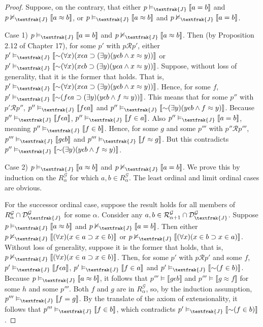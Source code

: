 \documentclass{article}
\newcommand*{\oldneg}{\mathord{\sim}}
\newcommand{\lbc}{\llbracket}
\newcommand{\rbc}{\rrbracket}
\theoremstyle{definition}
\begin{document}
\begin{proof}
Suppose, on the contrary, that either $p\vDash_\textfrak{J}\lbc a=b\rbc$ and 
$p\nvDash_\textfrak{J}\lbc a\approx b\rbc$, or
$p\vDash_\textfrak{J}\lbc a\approx b\rbc$ and $p\nvDash_\textfrak{J}\lbc a=b\rbc$.

Case 1) $p\vDash_\textfrak{J}\lbc a=b\rbc$ and 
$p\nvDash_\textfrak{J}\lbc a\approx b\rbc$. Then (by Proposition 2.12 of Chapter 17), for some $p'$ with $p\mathcal{R}p'$,
either $p'\vDash_\textfrak{J}\lbc\oldneg(\forall x)(x\epsilon a\supset(\exists y)(y\epsilon b\wedge x\approx y))\rbc$ or
$p'\vDash_\textfrak{J}\lbc\oldneg(\forall x)(x\epsilon b\supset(\exists y)(y\epsilon a\wedge x\approx y))\rbc$. Suppose, without loss of generality, that it is the 
former that holds. That is, $p'\vDash_\textfrak{J}\lbc\oldneg(\forall x)(x\epsilon a\supset(\exists y)(y\epsilon b\wedge x\approx y))\rbc$. Hence, 
for some $f$, $p'\vDash_\textfrak{J}\lbc\oldneg(f\epsilon a\supset(\exists y)(y\epsilon b\wedge f\approx y))\rbc$. This means that for some 
$p''$ with $p'\mathcal{R}p''$,
$p''\vDash_\textfrak{J}\lbc f\epsilon a\rbc$ and $p''\vDash_\textfrak{J}\lbc\oldneg(\exists y)(y\epsilon b\wedge f\approx y)\rbc$. Because 
$p''\vDash_\textfrak{J}\lbc f\epsilon a\rbc$, $p''\vDash_\textfrak{J}\lbc f\in a\rbc$. Also
$p''\vDash_\textfrak{J}\lbc a=b\rbc$, meaning $p''\vDash_\textfrak{J}\lbc f\in b\rbc$. Hence, for some 
$g$ and some $p'''$ with $p''\mathcal{R}p'''$, $p'''\vDash_\textfrak{J}\lbc g\epsilon b\rbc$ and 
$p'''\vDash_\textfrak{J}\lbc f\approx g\rbc$. But this contradicts $p''\vDash_\textfrak{J}\lbc\oldneg(\exists y)(y\epsilon b\wedge f\approx y)\rbc$.

Case 2) $p\vDash_\textfrak{J}\lbc a\approx b\rbc$ and $p\nvDash_\textfrak{J}\lbc a=b\rbc$. We prove this by induction on the 
$R^\mathcal{G}_\alpha$ for which $a,b\in R^\mathcal{G}_\alpha$. The least ordinal and limit ordinal cases are obvious.

For the successor ordinal case, suppose the result holds for all members of 
$R^\mathcal{G}_\alpha\cap\mathcal{D}^\mathcal{G}_\textfrak{J}$ for some $\alpha$. Consider any 
$a,b\in\mathcal{R}^\mathcal{G}_{\alpha+1}\cap\mathcal{D}^\mathcal{G}_\textfrak{J}$. Suppose 
$p\vDash_\textfrak{J}\lbc a\approx b\rbc$ and $p\nvDash_\textfrak{J}\lbc a=b\rbc$. Then either
$p\nvDash_\textfrak{J}\lbc(\forall x)(x\in a\supset x\in b)\rbc$ or $p\nvDash_\textfrak{J}\lbc(\forall x)(x\in b\supset x\in a)\rbc$. Without loss of 
generality, suppose it is the former that holds, that is, $p\nvDash_\textfrak{J}\lbc(\forall x)(x\in a\supset x\in b)\rbc$. Then, for some 
$p'$ with $p\mathcal{R}p'$ and some $f$, $p'\vDash_\textfrak{J}\lbc f\epsilon a\rbc$,
$p'\vDash_\textfrak{J}\lbc f\in a\rbc$ and $p'\vDash_\textfrak{J}\lbc\oldneg(f\in b)\rbc$.
Because $p\vDash_\textfrak{J}\lbc a\approx b\rbc$, it follows that 
$p'''\vDash\lbc g\epsilon b\rbc$ and $p'''\vDash\lbc g\approx f\rbc$ for some $h$ and some $p'''$. 
Both $f$ and $g$ are in $R^\mathcal{G}_\alpha$, so, by the induction assumption,
$p'''\vDash_\textfrak{J}\lbc f=g\rbc$. By the translate of the axiom of extensionality, it follows that 
$p'''\vDash_\textfrak{J}\lbc f\in b\rbc$, which contradicts $p'\vDash_\textfrak{J}\lbc\oldneg(f\in b)\rbc$.


\end{proof}
\end{document}
